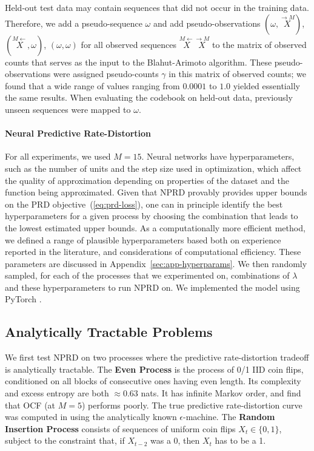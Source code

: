 \documentclass[entropy,article,submit,moreauthors,pdftex,10pt,a4paper]{Definitions/mdpi}
\newcommand{\key}{\textbf}
\newcommand{\finitefuture}{\stackrel{\rightarrow \scriptscriptstyle{M}}{X}}
\newcommand{\finitepast}{\stackrel{\scriptscriptstyle{M}\leftarrow}{X}}%
\begin{document}
Held-out test data may contain sequences that did not occur in the training data. Therefore, we add a pseudo-sequence $\omega$ and add pseudo-observations $(\omega, \finitefuture)$, $(\finitepast, \omega)$, $(\omega, \omega)$ for all observed sequences $\finitepast\finitefuture$ to the matrix of observed counts that serves as the input to the Blahut-Arimoto algorithm.
These pseudo-observations were assigned pseudo-counts $\gamma$ in this matrix of observed counts; we found that a wide range of values ranging from $0.0001$ to $1.0$ yielded essentially the same results.
When evaluating the codebook on held-out data, previously unseen sequences were mapped to $\omega$.


\paragraph{Neural Predictive Rate-Distortion}
For all experiments, we used $M=15$.
Neural networks have hyperparameters, such as the number of units and the step size used in optimization, which affect the quality of approximation depending on properties of the dataset and the function being approximated.
Given that NPRD provably provides upper bounds on the PRD objective~(\ref{eq:prd-loss}), one can in principle identify the best hyperparameters for a given process by choosing the combination that leads to the lowest estimated upper bounds.
As a computationally more efficient method, we defined a range of plausible hyperparameters based both on experience reported in the literature, and considerations of computational efficiency.
These parameters are discussed in Appendix~\ref{sec:app-hyperparams}.
We then randomly sampled, for each of the processes that we experimented on, combinations of $\lambda$ and these hyperparameters to run NPRD on.
We implemented the model using PyTorch \citep{paszke2017automatic}.

\subsection{Analytically Tractable Problems}\label{sec:tractable}

We first test NPRD on two processes where the predictive rate-distortion tradeoff is analytically tractable. 
The \key{Even Process} \citep{marzen-predictive-2016} is the process of 0/1 IID coin flips, conditioned on all blocks of consecutive ones having even length.
Its complexity and excess entropy are both $\approx 0.63$ nats. %
It has infinite Markov order, and \citet{marzen-predictive-2016} find that OCF (at $M=5$) performs poorly. %
The true predictive rate-distortion curve was computed in \cite{marzen-predictive-2016} using the analytically known $\epsilon$-machine.
The \key{Random Insertion Process} \citep{marzen-predictive-2016} consists of sequences of uniform coin flips $X_t \in \{0,1\}$, subject to the constraint that, if $X_{t-2}$ was a 0, then $X_{t}$ has to be a 1.
\end{document}
